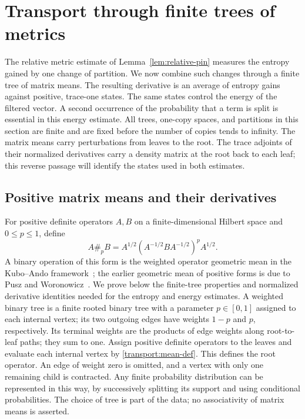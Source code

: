 \section{Transport through finite trees of metrics}\label{sec:transport}

The relative metric estimate of Lemma~\ref{lem:relative-pin} measures the
entropy gained by one change of partition.  We now combine such changes
through a finite tree of matrix means.  The resulting derivative is an
average of entropy gains against positive, trace-one states.  The same
states control the energy of the filtered vector.  A second occurrence of
the probability that a term is split is essential in this energy estimate.
All trees, one-copy spaces, and partitions in this section are finite and
are fixed before the number of copies tends to infinity.
The matrix means carry perturbations from leaves to the root.  The trace
adjoints of their normalized derivatives carry a density matrix at the
root back to each leaf; this reverse passage will identify the states
used in both estimates.

\subsection{Positive matrix means and their derivatives}

For positive definite operators $A,B$ on a finite-dimensional Hilbert
space and $0\leq p\leq1$, define
\begin{equation}\label{transport:mean-def}
 A\#_p B=A^{1/2}(A^{-1/2}BA^{-1/2})^pA^{1/2}.
\end{equation}
A binary operation of this form is the weighted operator geometric mean
in the Kubo--Ando framework~\cite{KuboAndo1980}; the earlier geometric
mean of positive forms is due to Pusz and Woronowicz~\cite{PuszWoronowicz1975}.
We prove below the finite-tree properties and normalized derivative
identities needed for the entropy and energy estimates.
A weighted binary tree is a finite rooted binary tree with a parameter
$p\in[0,1]$ assigned to each internal vertex; its two outgoing edges
have weights $1-p$ and $p$, respectively.
Its terminal weights are the products of edge weights along root-to-leaf
paths; they sum to one.  Assign positive definite operators to the leaves
and evaluate each internal vertex by \eqref{transport:mean-def}.  This
defines the root operator.  An edge of weight zero is omitted, and a
vertex with only one remaining child is contracted.  Any finite
probability distribution can be represented in this way, by successively
splitting its support and using conditional probabilities.  The choice of
tree is part of the data; no associativity of matrix means is asserted.

